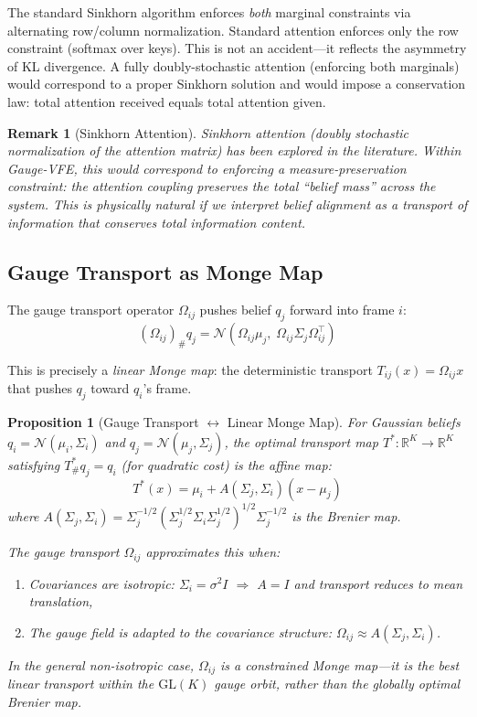 \documentclass[11pt]{article}
\newtheorem{proposition}{Proposition}
\newtheorem{remark}{Remark}
\newcommand{\GL}{\mathrm{GL}}
\newcommand{\R}{\mathbb{R}}
\begin{document}
The standard Sinkhorn algorithm enforces \emph{both} marginal constraints via alternating row/column normalization. Standard attention enforces only the row constraint (softmax over keys). This is not an accident---it reflects the asymmetry of KL divergence. A fully doubly-stochastic attention (enforcing both marginals) would correspond to a proper Sinkhorn solution and would impose a conservation law: total attention received equals total attention given.

\begin{remark}[Sinkhorn Attention]
Sinkhorn attention (doubly stochastic normalization of the attention matrix) has been explored in the literature. Within Gauge-VFE, this would correspond to enforcing a measure-preservation constraint: the attention coupling preserves the total ``belief mass'' across the system. This is physically natural if we interpret belief alignment as a transport of information that conserves total information content.
\end{remark}

\subsection{Gauge Transport as Monge Map}

The gauge transport operator $\Omega_{ij}$ pushes belief $q_j$ forward into frame $i$:
\[
(\Omega_{ij})_\# q_j = \mathcal{N}(\Omega_{ij}\mu_j,\; \Omega_{ij}\Sigma_j\Omega_{ij}^\top)
\]

This is precisely a \emph{linear Monge map}: the deterministic transport $T_{ij}(x) = \Omega_{ij}x$ that pushes $q_j$ toward $q_i$'s frame.

\begin{proposition}[Gauge Transport $\leftrightarrow$ Linear Monge Map]\label{prop:gauge-monge}
For Gaussian beliefs $q_i = \mathcal{N}(\mu_i, \Sigma_i)$ and $q_j = \mathcal{N}(\mu_j, \Sigma_j)$, the optimal transport map $T^*: \R^K \to \R^K$ satisfying $T^*_\# q_j = q_i$ (for quadratic cost) is the affine map:
\[
T^*(x) = \mu_i + A(\Sigma_j, \Sigma_i)(x - \mu_j)
\]
where $A(\Sigma_j, \Sigma_i) = \Sigma_j^{-1/2}(\Sigma_j^{1/2}\Sigma_i\Sigma_j^{1/2})^{1/2}\Sigma_j^{-1/2}$ is the Brenier map.

The gauge transport $\Omega_{ij}$ approximates this when:
\begin{enumerate}
    \item Covariances are isotropic: $\Sigma_i = \sigma^2 I$ $\Rightarrow$ $A = I$ and transport reduces to mean translation,
    \item The gauge field is adapted to the covariance structure: $\Omega_{ij} \approx A(\Sigma_j, \Sigma_i)$.
\end{enumerate}

In the general non-isotropic case, $\Omega_{ij}$ is a \emph{constrained} Monge map---it is the best \emph{linear} transport within the $\GL(K)$ gauge orbit, rather than the globally optimal Brenier map.
\end{proposition}
\end{document}
